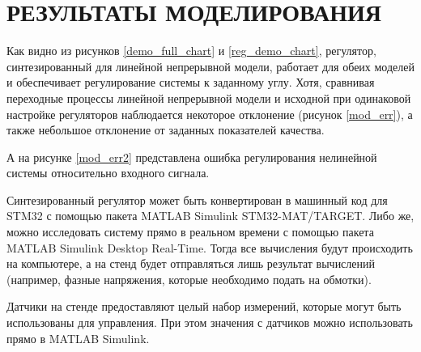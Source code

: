 \section{РЕЗУЛЬТАТЫ МОДЕЛИРОВАНИЯ}

Как видно из рисунков \ref{demo_full_chart} и \ref{reg_demo_chart}, регулятор, 
синтезированный
для линейной непрерывной модели, работает для обеих моделей и 
обеспечивает регулирование системы к заданному углу. Хотя, сравнивая
переходные процессы линейной непрерывной модели и исходной
при одинаковой настройке регуляторов
наблюдается некоторое отклонение (рисунок \ref{mod_err}), а также 
небольшое отклонение от заданных показателей качества.


А на рисунке \ref{mod_err2} представлена ошибка
регулирования нелинейной системы относительно входного сигнала.


Синтезированный регулятор может быть конвертирован в машинный код
для STM32 с помощью пакета MATLAB Simulink \mbox{STM32-MAT/TARGET}.
Либо же, можно исследовать систему прямо в реальном времени с помощью
пакета MATLAB Simulink Desktop Real-Time. Тогда все вычисления будут
происходить на компьютере, а на стенд будет отправляться лишь результат 
вычислений (например, фазные напряжения, которые необходимо подать на обмотки).

Датчики на стенде предоставляют целый набор измерений, которые
могут быть использованы для управления. При этом значения с датчиков
можно использовать прямо в MATLAB Simulink.